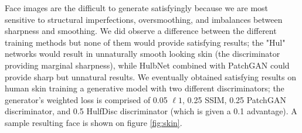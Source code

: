Face images are the difficult to generate satisfyingly because we are most sensitive to structural imperfections, oversmoothing, and imbalances between sharpness and smoothing. We did observe a difference between the different training methods but none of them would provide satisfying results; the "Hul" networks would result in unnaturally smooth looking skin (the discriminator providing marginal sharpness), while HulbNet combined with PatchGAN could provide sharp but unnatural results. We eventually obtained satisfying results on human skin training a generative model with two different discriminators; the generator's weighted loss is comprised of 0.05 $\ell 1$, 0.25 \ac{SSIM}, 0.25 PatchGAN discriminator, and 0.5 HulfDisc discriminator (which is given a 0.1 advantage). A sample resulting face is shown on figure \ref{fig:skin}.








